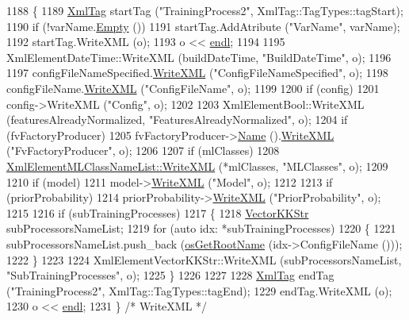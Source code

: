 \begin{DoxyCode}
1188 \{
1189   \hyperlink{class_k_k_b_1_1_xml_tag}{XmlTag}  startTag (\textcolor{stringliteral}{"TrainingProcess2"},  XmlTag::TagTypes::tagStart);
1190   \textcolor{keywordflow}{if}  (!varName.\hyperlink{class_k_k_b_1_1_k_k_str_ac69942f73fffd672ec2a6e1c410afdb6}{Empty} ())
1191     startTag.AddAtribute (\textcolor{stringliteral}{"VarName"}, varName);
1192   startTag.WriteXML (o);
1193   o << \hyperlink{namespace_k_k_b_ad1f50f65af6adc8fa9e6f62d007818a8}{endl};
1194 
1195   XmlElementDateTime::WriteXML (buildDateTime, \textcolor{stringliteral}{"BuildDateTime"}, o);
1196 
1197   configFileNameSpecified.\hyperlink{class_k_k_b_1_1_k_k_str_a7de8ac49f70cdcdf2cc31786d23b8a62}{WriteXML} (\textcolor{stringliteral}{"ConfigFileNameSpecified"}, o);
1198   configFileName.\hyperlink{class_k_k_b_1_1_k_k_str_a7de8ac49f70cdcdf2cc31786d23b8a62}{WriteXML} (\textcolor{stringliteral}{"ConfigFileName"}, o);
1199 
1200   \textcolor{keywordflow}{if}  (config)
1201     config->WriteXML (\textcolor{stringliteral}{"Config"}, o);
1202 
1203   XmlElementBool::WriteXML (featuresAlreadyNormalized, \textcolor{stringliteral}{"FeaturesAlreadyNormalized"}, o);
1204   \textcolor{keywordflow}{if}  (fvFactoryProducer)
1205     fvFactoryProducer->\hyperlink{class_k_k_m_l_l_1_1_factory_f_v_producer_adbdfab027b335694c46d969d84ea1213}{Name} ().\hyperlink{class_k_k_b_1_1_k_k_str_a7de8ac49f70cdcdf2cc31786d23b8a62}{WriteXML} (\textcolor{stringliteral}{"FvFactoryProducer"}, o);
1206 
1207   \textcolor{keywordflow}{if}  (mlClasses)
1208     \hyperlink{class_k_k_m_l_l_1_1_xml_element_m_l_class_name_list_a4aa7bfd29f8150ff0d4097646aa9fa77}{XmlElementMLClassNameList::WriteXML} (*mlClasses, \textcolor{stringliteral}{"MLClasses"}, o);
1209 
1210   \textcolor{keywordflow}{if}  (model)
1211     model->\hyperlink{class_k_k_m_l_l_1_1_model_aa6bd59246f77cf9de83c6684041c0127}{WriteXML} (\textcolor{stringliteral}{"Model"}, o);
1212 
1213   \textcolor{keywordflow}{if}  (priorProbability)
1214     priorProbability->\hyperlink{class_k_k_m_l_l_1_1_class_prob_list_abb8848cedbdfce81ffbee6663c5c6dec}{WriteXML} (\textcolor{stringliteral}{"PriorProbability"}, o);
1215 
1216   \textcolor{keywordflow}{if}  (subTrainingProcesses)
1217   \{
1218     \hyperlink{class_k_k_b_1_1_vector_k_k_str}{VectorKKStr}  subProcessorsNameList;
1219     \textcolor{keywordflow}{for}  (\textcolor{keyword}{auto} idx:  *subTrainingProcesses)
1220     \{
1221       subProcessorsNameList.push\_back (\hyperlink{namespace_k_k_b_af5b668ed9902d7f93b62529664a739f0}{osGetRootName} (idx->ConfigFileName ()));
1222     \}
1223 
1224     XmlElementVectorKKStr::WriteXML (subProcessorsNameList, \textcolor{stringliteral}{"SubTrainingProcesses"}, o);
1225   \}
1226 
1227 
1228   \hyperlink{class_k_k_b_1_1_xml_tag}{XmlTag}  endTag (\textcolor{stringliteral}{"TrainingProcess2"}, XmlTag::TagTypes::tagEnd);
1229   endTag.WriteXML (o);
1230   o << \hyperlink{namespace_k_k_b_ad1f50f65af6adc8fa9e6f62d007818a8}{endl};
1231 \}  \textcolor{comment}{/* WriteXML */}
\end{DoxyCode}


